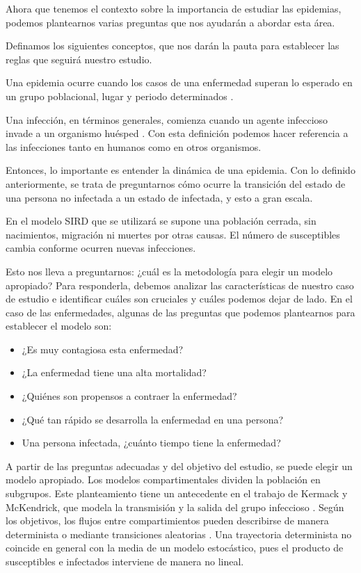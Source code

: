 Ahora que tenemos el contexto sobre la importancia de estudiar las epidemias, podemos plantearnos varias preguntas que nos ayudarán a abordar esta área.

Definamos los siguientes conceptos, que nos darán la pauta para establecer las reglas que seguirá nuestro estudio.

Una epidemia ocurre cuando los casos de una enfermedad superan lo esperado en un grupo poblacional, lugar y periodo determinados \cite{pelaez2020}.

Una infección, en términos generales, comienza cuando un agente infeccioso invade a un organismo huésped \cite{vynnycky2010}. Con esta definición podemos hacer referencia a las infecciones tanto en humanos como en otros organismos.

Entonces, lo importante es entender la dinámica de una epidemia. Con lo definido anteriormente, se trata de preguntarnos cómo ocurre la transición del estado de una persona no infectada a un estado de infectada, y esto a gran escala.

En el modelo SIRD que se utilizará se supone una población cerrada, sin nacimientos, migración ni muertes por otras causas. El número de susceptibles cambia conforme ocurren nuevas infecciones.

Esto nos lleva a preguntarnos: ¿cuál es la metodología para elegir un modelo apropiado? Para responderla, debemos analizar las características de nuestro caso de estudio e identificar cuáles son cruciales y cuáles podemos dejar de lado. En el caso de las enfermedades, algunas de las preguntas que podemos plantearnos para establecer el modelo son:

\begin{itemize}
    \item ¿Es muy contagiosa esta enfermedad?
    \item ¿La enfermedad tiene una alta mortalidad?
    \item ¿Quiénes son propensos a contraer la enfermedad?
    \item ¿Qué tan rápido se desarrolla la enfermedad en una persona?
    \item Una persona infectada, ¿cuánto tiempo tiene la enfermedad?
\end{itemize}


A partir de las preguntas adecuadas y del objetivo del estudio, se puede elegir un modelo apropiado. Los modelos compartimentales dividen la población en subgrupos. Este planteamiento tiene un antecedente en el trabajo de Kermack y McKendrick, que modela la transmisión y la salida del grupo infeccioso \cite{kermack1927}. Según los objetivos, los flujos entre compartimientos pueden describirse de manera determinista o mediante transiciones aleatorias \cite{keeling2008}. Una trayectoria determinista no coincide en general con la media de un modelo estocástico, pues el producto de susceptibles e infectados interviene de manera no lineal.


